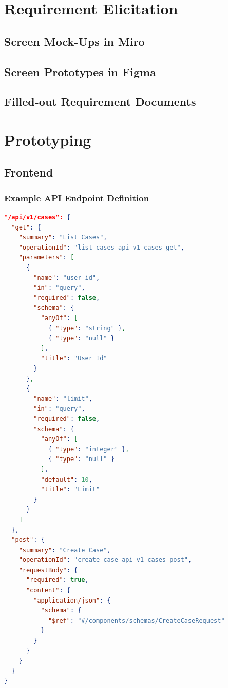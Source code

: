 \section{Requirement Elicitation}\label{sec:requirement-elicitation}
\subsection{Screen Mock-Ups in Miro}\label{subsec:screen-mock-ups-in-miro}
\subsection{Screen Prototypes in Figma}\label{subsec:screen-prototypes-in-figma}
\subsection{Filled-out Requirement Documents}\label{subsec:filled-out-requirement-documents}
\section{Prototyping}
\subsection{Frontend}\label{subsec:frontend}
\subsubsection{Example API Endpoint Definition}
\begin{lstlisting}[language=JSON, caption={Example API Endpoint Definition (\texttt{v1.json})},
  numbers=none,label={lst:api-v1-json}]
"/api/v1/cases": {
  "get": {
    "summary": "List Cases",
    "operationId": "list_cases_api_v1_cases_get",
    "parameters": [
      {
        "name": "user_id",
        "in": "query",
        "required": false,
        "schema": {
          "anyOf": [
            { "type": "string" },
            { "type": "null" }
          ],
          "title": "User Id"
        }
      },
      {
        "name": "limit",
        "in": "query",
        "required": false,
        "schema": {
          "anyOf": [
            { "type": "integer" },
            { "type": "null" }
          ],
          "default": 10,
          "title": "Limit"
        }
      }
    ]
  },
  "post": {
    "summary": "Create Case",
    "operationId": "create_case_api_v1_cases_post",
    "requestBody": {
      "required": true,
      "content": {
        "application/json": {
          "schema": {
            "$ref": "#/components/schemas/CreateCaseRequest"
          }
        }
      }
    }
  }
}
\end{lstlisting}
